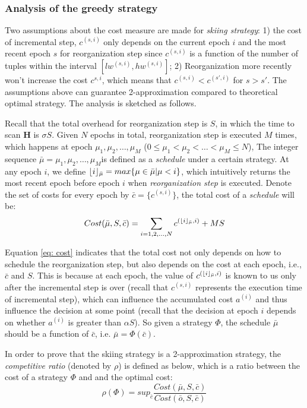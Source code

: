\subsubsection{Analysis of the greedy strategy}
Two assumptions about the cost measure are made for {\em skiing strategy}: 1) the cost of incremental step, $c^{(s, i)}$ only depends on the current epoch $i$ and the most recent epoch $s$ for reorganization step since $c^{(s, i)}$ is a function of the number of tuples within the interval $[lw^{(s,i)}, hw^{(s,i)}]$; 2) Reorganization more recently won't increase the cost $c^{s,i}$, which means that $c^{(s, i)} < c^{(s',i)}$ for $s > s'$. The assumptions above can guarantee 2-approximation compared to theoretical optimal strategy. The analysis is sketched as follows.

Recall that the total overhead for reorganization step is $S$, in which the time to scan $\textbf{H}$ is $\sigma S$. Given $N$ epochs in total, reorganization step is executed $M$ times, which happens at epoch $\mu_1, \mu_2,\dots, \mu_M$ ($0 \leq \mu_1 < \mu_2 < \dots < \mu_M \leq N$), The integer sequence $\bar{\mu} = \mu_1, \mu_2,\dots, \mu_M$is defined as a {\em schedule} under a certain strategy. At any epoch $i$, we define $\lfloor i\rfloor_{\bar{\mu}} = max\{\mu \in \bar{\mu} | \mu < i\}$, which intuitively returns the most recent epoch before epoch $i$ when {\em reorganization step} is executed. Denote the set of costs for every epoch by $\bar{c} = \{c^{(s,i)}\}$, the total cost of a {\em schedule} will be:
\begin{equation}\label{eq: cost}
    Cost(\bar{\mu}, S, \bar{c}) = \sum_{i=1,2,\dots,N}c^{(\lfloor i\rfloor_{\bar{\mu}}, i)} + MS
\end{equation}

Equation \ref{eq: cost} indicates that the total cost not only depends on how to schedule the reorganization step, but also depends on the cost at each epoch, i.e., $\bar{c}$ and $S$. This is because at each epoch, the value of $c^{(\lfloor i\rfloor_{\bar{\mu}}, i)}$ is known to us only after the incremental step is over (recall that $c^{(s,i)}$ represents the execution time of incremental step), which can influence the accumulated cost $a^{(i)}$ and thus influence the decision at some point (recall that the decision at epoch $i$ depends on whether $a^{(i)}$ is greater than $\alpha S$). So given a strategy $\Phi$, the schedule $\bar{\mu}$ should be a function of $\bar{c}$, i.e. $\bar{\mu} = \Phi(\bar{c})$.

In order to prove that the skiing strategy is a 2-approximation strategy, the {\em competitive ratio} (denoted by $\rho$) is defined as below, which is a ratio between the cost of a strategy $\Phi$ and and the optimal cost:
\begin{equation}
    \rho(\Phi) = sup_{\bar{c}}\frac{Cost(\bar{\mu}, S, \bar{c})}{Cost(\bar{o}, S, \bar{c})}
\end{equation}


